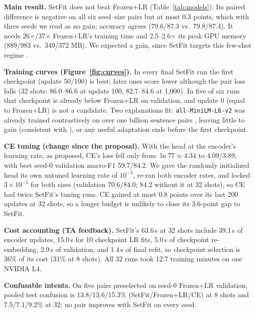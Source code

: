 \documentclass{article}
\begin{document}
\textbf{Main result.} SetFit does not beat Frozen+LR (Table~\ref{tab:models}). Its paired difference is negative on all six seed--size pairs but at most 0.3 points, which with three seeds we read as no gain; accuracy agrees (79.6/87.3 vs.\ 79.8/87.4). It needs 26$\times$/37$\times$ Frozen+LR's training time and 2.5--2.6$\times$ its peak GPU memory (889/983 vs.\ 349/372 MB). We expected a gain, since SetFit targets this few-shot regime \citep{tunstall2022setfit}.

\textbf{Training curves (Figure~\ref{fig:curves}).} In every final SetFit run the first checkpoint (update 50/100) is best; later ones score lower although the pair loss falls (32 shots: 86.0--86.6 at update 100, 82.7--84.6 at 1,000). In five of six runs that checkpoint is already below Frozen+LR on validation, and update 0 (equal to Frozen+LR) is not a candidate. Two explanations fit: \texttt{all-MiniLM-L6-v2} was already trained contrastively on over one billion sentence pairs \citep{minilm2026}, leaving little to gain (consistent with \citep{ma2022sentence}), or any useful adaptation ends before the first checkpoint.

\textbf{CE tuning (change since the proposal).} With the head at the encoder's learning rate, as proposed, CE's loss fell only from $\ln 77\approx4.34$ to 4.09/3.89, with best seed-0 validation macro-F1 59.7/84.2. We gave the randomly initialized head its own untuned learning rate of $10^{-3}$, re-ran both encoder rates, and locked $3\times10^{-5}$ for both sizes (validation 70.6/84.0; 84.2 without it at 32 shots), so CE had twice SetFit's tuning runs. CE gained at most 0.8 points over its last 200 updates at 32 shots, so a longer budget is unlikely to close its 3.6-point gap to SetFit.

\textbf{Cost accounting (TA feedback).} SetFit's 63.6\,s at 32 shots include 39.1\,s of encoder updates, 15.0\,s for 10 checkpoint LR fits, 5.0\,s of checkpoint re-embedding, 2.9\,s of validation, and 1.4\,s of final refit, so checkpoint selection is 36\% of its cost (31\% at 8 shots). All 32 runs took 12.7 training minutes on one NVIDIA L4.

\textbf{Confusable intents.} On five pairs preselected on seed-0 Frozen+LR validation, pooled test confusion is 13.8/13.6/15.3\% (SetFit/Frozen+LR/CE) at 8 shots and 7.5/7.1/9.2\% at 32; no pair improves with SetFit on every seed.
\end{document}
